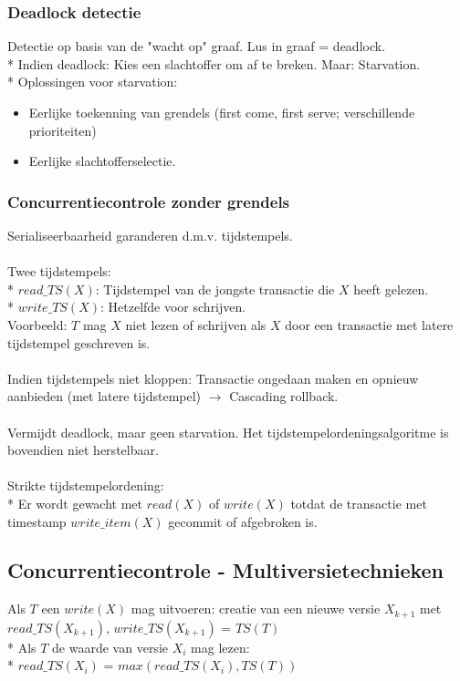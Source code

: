 \documentclass[10pt]{article}
\begin{document}
\subsubsection{Deadlock detectie}
Detectie op basis van de "wacht op" graaf. Lus in graaf = deadlock.\\*
Indien deadlock: Kies een slachtoffer om af te breken. Maar: Starvation.\\*
Oplossingen voor starvation:
\begin{itemize}
\item Eerlijke toekenning van grendels (first come, first serve; verschillende prioriteiten)
\item Eerlijke slachtofferselectie.
\end{itemize}
\subsubsection{Concurrentiecontrole zonder grendels}
Serialiseerbaarheid garanderen d.m.v. tijdstempels.\\\\
Twee tijdstempels:\\*
$read\_TS(X)$: Tijdstempel van de jongste transactie die $X$ heeft gelezen.\\*
$write\_TS(X)$: Hetzelfde voor schrijven.\\
Voorbeeld: $T$ mag $X$ niet lezen of schrijven als $X$ door een transactie met latere tijdstempel geschreven is.\\\\
Indien tijdstempels niet kloppen: Transactie ongedaan maken en opnieuw aanbieden (met latere tijdstempel) $\rightarrow$ Cascading rollback.\\\\
Vermijdt deadlock, maar geen starvation. Het tijdstempelordeningsalgoritme is bovendien niet herstelbaar.\\\\
Strikte tijdstempelordening:\\*
Er wordt gewacht met $read(X)$ of $write(X)$ totdat de transactie met timestamp $write\_item(X)$ gecommit of afgebroken is.
\subsection{Concurrentiecontrole - Multiversietechnieken}
Als $T$ een $write(X)$ mag uitvoeren: creatie van een nieuwe versie $X_{k+1}$ met $read\_TS(X_{k+1})$, $write\_TS(X_{k+1})$ = $TS(T)$\\*
Als $T$ de waarde van versie $X_i$ mag lezen:\\*
$read\_TS(X_i)$ = $max(read\_TS(X_i), TS(T))$
\end{document}
